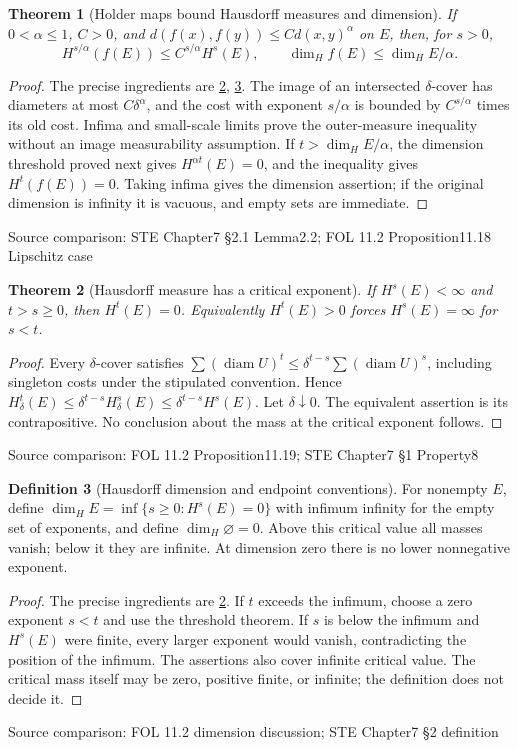 \documentclass[11pt,oneside,openany]{book}
\newtheorem{theorem}{Theorem}[chapter]
\theoremstyle{definition}
\newtheorem{definition}[theorem]{Definition}
\theoremstyle{remark}
\DeclareMathOperator{\diam}{diam}\DeclareMathOperator{\dist}{dist}
\newcommand{\family}[1]{}
\newcommand{\source}[1]{\par\begingroup\small\sffamily\color{black!65}Source comparison: #1\par\endgroup}
\begin{document}
\begin{theorem}[Holder maps bound Hausdorff measures and dimension]\family{D11.22.holder_image_bound}\label{d11:22:holder-image-bound}
If $0<\alpha\le1$, $C>0$, and $d(f(x),f(y))\le C d(x,y)^\alpha$ on $E$, then, for $s>0$,
\[H^{s/\alpha}(f(E))\le C^{s/\alpha}H^s(E),\qquad
\dim_H f(E)\le\dim_H E/\alpha.
\]
\end{theorem}
\begin{proof}
The precise ingredients are \cref{d11:22:exponent-threshold}, \cref{d11:22:dimension-definition}. The image of an intersected $\delta$-cover has diameters at most $C\delta^\alpha$, and the cost with exponent $s/\alpha$ is bounded by $C^{s/\alpha}$ times its old cost. Infima and small-scale limits prove the outer-measure inequality without an image measurability assumption. If $t>\dim_HE/\alpha$, the dimension threshold proved next gives $H^{\alpha t}(E)=0$, and the inequality gives $H^t(f(E))=0$. Taking infima gives the dimension assertion; if the original dimension is infinity it is vacuous, and empty sets are immediate.
\end{proof}
\source{STE Chapter7 §2.1 Lemma2.2; FOL 11.2 Proposition11.18 Lipschitz case}

\begin{theorem}[Hausdorff measure has a critical exponent]\family{D11.22.exponent_threshold}\label{d11:22:exponent-threshold}
If $H^s(E)<\infty$ and $t>s\ge0$, then $H^t(E)=0$. Equivalently $H^t(E)>0$ forces $H^s(E)=\infty$ for $s<t$.
\end{theorem}
\begin{proof}
Every $\delta$-cover satisfies $\sum(\diam U)^t\le\delta^{t-s}\sum(\diam U)^s$, including singleton costs under the stipulated convention. Hence $H^t_\delta(E)\le\delta^{t-s}H^s_\delta(E)\le\delta^{t-s}H^s(E)$. Let $\delta\downarrow0$. The equivalent assertion is its contrapositive. No conclusion about the mass at the critical exponent follows.
\end{proof}
\source{FOL 11.2 Proposition11.19; STE Chapter7 §1 Property8}

\begin{definition}[Hausdorff dimension and endpoint conventions]\family{D11.22.dimension_definition}\label{d11:22:dimension-definition}
For nonempty $E$, define $\dim_HE=\inf\{s\ge0:H^s(E)=0\}$ with infimum infinity for the empty set of exponents, and define $\dim_H\varnothing=0$. Above this critical value all masses vanish; below it they are infinite. At dimension zero there is no lower nonnegative exponent.
\end{definition}
\begin{proof}
The precise ingredients are \cref{d11:22:exponent-threshold}. If $t$ exceeds the infimum, choose a zero exponent $s<t$ and use the threshold theorem. If $s$ is below the infimum and $H^s(E)$ were finite, every larger exponent would vanish, contradicting the position of the infimum. The assertions also cover infinite critical value. The critical mass itself may be zero, positive finite, or infinite; the definition does not decide it.
\end{proof}
\source{FOL 11.2 dimension discussion; STE Chapter7 §2 definition}
\end{document}
